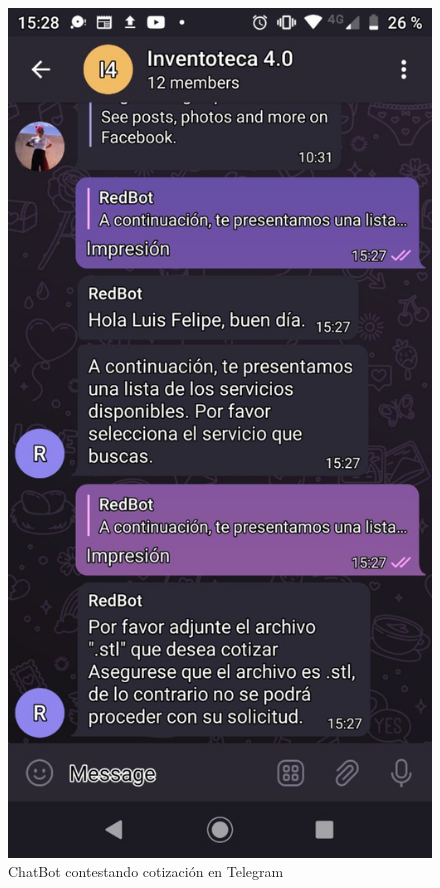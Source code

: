 \documentclass[conference]{IEEEtran}
\begin{document}
 \begin{figure}
 	\includegraphics[scale=0.5]{imagenes/img1.eps}
 	\caption{ChatBot contestando cotización en Telegram}
 	\label{fig:img1}
 \end{figure}
     
\end{document}
